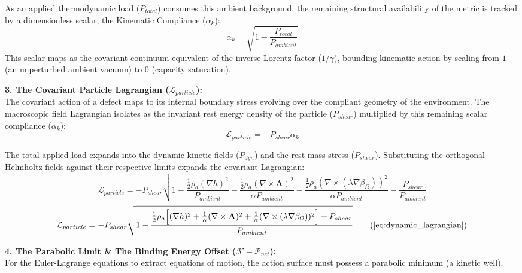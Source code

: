 As an applied thermodynamic load ($P_{total}$) consumes this ambient background, the remaining structural availability of the metric is tracked by a dimensionless scalar, the Kinematic Compliance ($\alpha_k$):
\begin{equation}
    \alpha_k = \sqrt{1 - \frac{P_{total}}{P_{ambient}}} \label{eq:kinematic_compliance}
\end{equation}
This scalar maps as the covariant continuum equivalent of the inverse Lorentz factor ($1/\gamma$), bounding kinematic action by scaling from $1$ (an unperturbed ambient vacuum) to $0$ (capacity saturation).

\vspace{0.2 cm}

\textbf{3. The Covariant Particle Lagrangian ($\mathcal{L}_{particle}$):} \\
The covariant action of a defect maps to its internal boundary stress evolving over the compliant geometry of the environment. The macroscopic field Lagrangian isolates as the invariant rest energy density of the particle ($P_{shear}$) multiplied by this remaining scalar compliance ($\alpha_k$): 
\begin{equation}
    \mathcal{L}_{particle} = - P_{shear} \alpha_k \label{eq:base_lagrangian}
\end{equation}

The total applied load expands into the dynamic kinetic fields ($P_{dyn}$) and the rest mass stress ($P_{shear}$). Substituting the orthogonal Helmholtz fields against their respective limits expands the covariant Lagrangian: 
\begin{equation}
    \mathcal{L}_{particle} = - P_{shear} \sqrt{1 - \frac{\frac{1}{2}\rho_a (\nabla h)^2}{P_{ambient}} - \frac{\frac{1}{2}\rho_a (\nabla \times \mathbf{A})^2}{\alpha P_{ambient}} - \frac{\frac{1}{2}\rho_a (\nabla \times (\lambda \nabla \beta_\Omega))^2}{\alpha P_{ambient}} - \frac{P_{shear}}{P_{ambient}}} \nonumber
\end{equation}
\begin{equation}
    \mathcal{L}_{particle} = - P_{shear} \sqrt{1 - \frac{\frac{1}{2}\rho_a \Big[ (\nabla h)^2 + \frac{1}{\alpha}(\nabla \times \mathbf{A})^2 + \frac{1}{\alpha}(\nabla \times (\lambda \nabla \beta_\Omega))^2 \Big] + P_{shear}}{P_{ambient}}} \tag{\ref{eq:dynamic_lagrangian}}
\end{equation}

\textbf{4. The Parabolic Limit \& The Binding Energy Offset ($\mathcal{K} - \mathcal{P}_{net}$):} \\
For the Euler-Lagrange equations to extract equations of motion, the action surface must possess a parabolic minimum (a kinetic well). 

